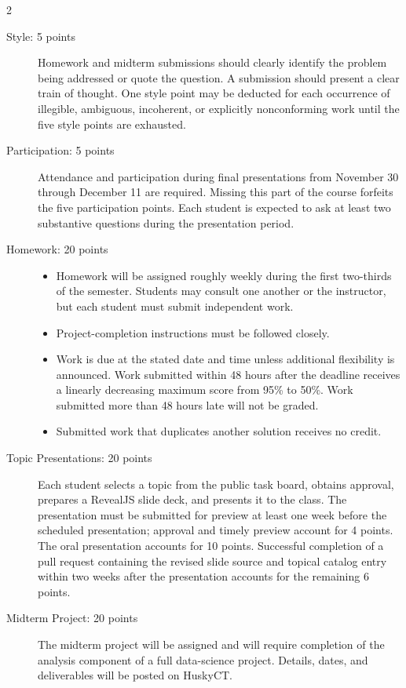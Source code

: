 \documentclass{article}
\begin{document}
\begin{multicols}{2}
\begin{description}
\item[Style: 5 points]
  Homework and midterm submissions should clearly identify the problem being
  addressed or quote the question. A submission should present a clear train
  of thought. One style point may be deducted for each occurrence of
  illegible, ambiguous, incoherent, or explicitly nonconforming work until the
  five style points are exhausted.

\item[Participation: 5 points]
  Attendance and participation during final presentations from November 30
  through December 11 are required. Missing this part of the course forfeits
  the five participation points. Each student is expected to ask at least two
  substantive questions during the presentation period.

\item[Homework: 20 points]\hspace{0pt}
\begin{itemize}
\item Homework will be assigned roughly weekly during the first two-thirds of
  the semester. Students may consult one another or the instructor, but each
  student must submit independent work.
\item Project-completion instructions must be followed closely.
\item Work is due at the stated date and time unless additional flexibility is
  announced. Work submitted within 48 hours after the deadline receives a
  linearly decreasing maximum score from 95\% to 50\%. Work submitted more
  than 48 hours late will not be graded.
\item Submitted work that duplicates another solution receives no credit.
\end{itemize}

\item[Topic Presentations: 20 points]
  Each student selects a topic from the public task board, obtains approval,
  prepares a RevealJS slide deck, and presents it to the class. The
  presentation must be submitted for preview at least one week before the
  scheduled presentation; approval and timely preview account for 4 points.
  The oral presentation accounts for 10 points. Successful completion of a pull request containing
  the revised slide source and topical catalog entry within two weeks after
  the presentation accounts for the remaining 6 points.

\item[Midterm Project: 20 points]
  The midterm project will be assigned and will require completion of the
  analysis component of a full data-science project. Details, dates, and
  deliverables will be posted on HuskyCT.


\end{description}
\end{multicols}
\end{document}
